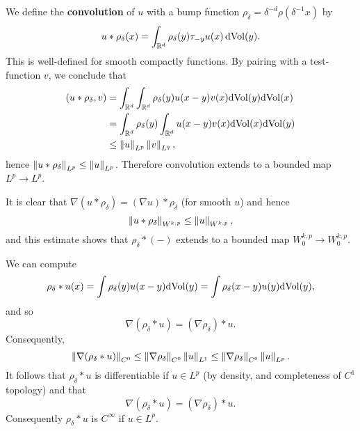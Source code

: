 We define the \textbf{convolution} of $u$ with a bump function $\rho_{\delta}=\delta^{-d}\rho(\delta^{-1} x)$ by
\begin{equation*}
  u\ast\rho_{\delta}(x)=\int_{\mathbb{R}^{d}} \rho_{\delta}(y)\tau_{-y}u(x)\,\mathrm{dVol}(y).
\end{equation*}
This is well-defined for smooth compactly functions. By pairing with a test-function $v$, we conclude that
\begin{equation*}
  \begin{aligned}
    (u\ast\rho_{\delta},v)&=\int_{\mathbb{R}^{d}} \int_{\mathbb{R}^{d}} \rho_{\delta}(y)u(x-y)v(x)\mathrm{d}\mathrm{Vol}(y)\mathrm{d}\mathrm{Vol}(x)\\
    &=\int_{\mathbb{R}^{d}}\rho_{\delta}(y)\int_{\mathbb{R}^{d}}u(x-y)v(x)\mathrm{d}\mathrm{Vol}(x)\mathrm{d}\mathrm{Vol}(y)\\
    &\le \left\lVert u\right\rVert_{L^{p}}\left\lVert v\right\rVert_{L^{q}},
  \end{aligned}
\end{equation*}
hence $\left\lVert u\ast\rho_{\delta}\right\rVert_{L^{p}}\le \left\lVert u\right\rVert_{L^{p}}$. Therefore convolution extends to a bounded map $L^{p}\to L^{p}$.

It is clear that $\nabla(u\ast\rho_{\delta})=(\nabla u)\ast\rho_{\delta}$ (for smooth $u$) and hence 
\begin{equation*}
  \left\lVert u\ast\rho_{\delta}\right\rVert_{W^{k,p}}\le \left\lVert u\right\rVert_{W^{k,p}},
\end{equation*}
and this estimate shows that $\rho_{\delta}\ast(-)$ extends to a bounded map $W^{k,p}_{0}\to W^{k,p}_{0}$.

We can compute
\begin{equation*}
  \rho_{\delta}\ast u(x)=\int \rho_{\delta}(y)u(x-y)\mathrm{d}\mathrm{Vol}(y)=\int \rho_{\delta}(x-y)u(y)\mathrm{dVol}(y),
\end{equation*}
and so
\begin{equation*}
  \nabla (\rho_{\delta}\ast u)=(\nabla \rho_{\delta})\ast u.
\end{equation*}
Consequently,
\begin{equation*}
  \left\lVert\nabla (\rho_{\delta}\ast u)\right\rVert_{C^{0}}\le \left\lVert\nabla \rho_{\delta}\right\rVert_{C^{0}}\left\lVert u\right\rVert_{L^{1}}\le \left\lVert\nabla \rho_{\delta}\right\rVert_{C^{0}}\left\lVert u\right\rVert_{L^{p}}.
\end{equation*}
It follows that $\rho_{\delta}\ast u$ is differentiable if $u\in L^{p}$ (by density, and completeness of $C^{1}$ topology) and that
\begin{equation*}
  \nabla(\rho_{\delta}\ast u)=(\nabla \rho_{\delta})\ast u. 
\end{equation*}
Consequently $\rho_{\delta}\ast u$ is $C^{\infty}$ if $u\in L^{p}$.

